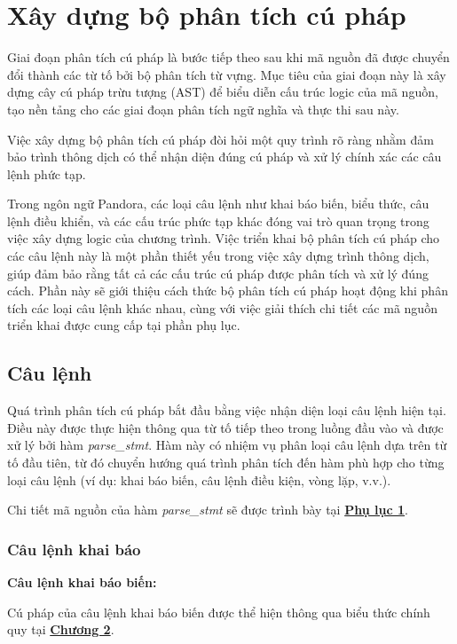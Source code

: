 \section{Xây dựng bộ phân tích cú pháp}
Giai đoạn phân tích cú pháp là bước tiếp theo sau khi mã nguồn đã được chuyển đổi thành các từ tố bởi bộ phân tích từ vựng. Mục tiêu của giai đoạn này là xây dựng cây cú pháp trừu tượng (AST) để biểu diễn cấu trúc logic của mã nguồn, tạo nền tảng cho các giai đoạn phân tích ngữ nghĩa và thực thi sau này. 

Việc xây dựng bộ phân tích cú pháp đòi hỏi một quy trình rõ ràng nhằm đảm bảo trình thông dịch có thể nhận diện đúng cú pháp và xử lý chính xác các câu lệnh phức tạp.

Trong ngôn ngữ Pandora, các loại câu lệnh như khai báo biến, biểu thức, câu lệnh điều khiển, và các cấu trúc phức tạp khác đóng vai trò quan trọng trong việc xây dựng logic của chương trình. Việc triển khai bộ phân tích cú pháp cho các câu lệnh này là một phần thiết yếu trong việc xây dựng trình thông dịch, giúp đảm bảo rằng tất cả các cấu trúc cú pháp được phân tích và xử lý đúng cách. Phần này sẽ giới thiệu cách thức bộ phân tích cú pháp hoạt động khi phân tích các loại câu lệnh khác nhau, cùng với việc giải thích chi tiết các mã nguồn triển khai được cung cấp tại phần phụ lục.

\subsection{Câu lệnh}
Quá trình phân tích cú pháp bắt đầu bằng việc nhận diện loại câu lệnh hiện tại. Điều này được thực hiện thông qua từ tố tiếp theo trong luồng đầu vào và được xử lý bởi hàm \textit{parse\_stmt}. Hàm này có nhiệm vụ phân loại câu lệnh dựa trên từ tố đầu tiên, từ đó chuyển hướng quá trình phân tích đến hàm phù hợp cho từng loại câu lệnh (ví dụ: khai báo biến, câu lệnh điều kiện, vòng lặp, v.v.).

Chi tiết mã nguồn của hàm \textit{parse\_stmt} sẽ được trình bày tại \hyperref[ap1:stmt]{\bf Phụ lục 1}. %


\subsubsection{Câu lệnh khai báo}

\noindent\textbf{Câu lệnh khai báo biến:}

Cú pháp của câu lệnh khai báo biến được thể hiện thông qua biểu thức chính quy tại \hyperref[ch2:decl_var_stmt]{\bf Chương 2}.

